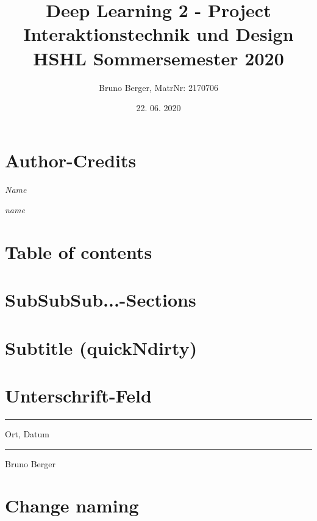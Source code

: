\section{Author-Credits}

\hfill\textnormal{\emph{Name}}

\begin{flushright}
\emph{name}
\end{flushright}

\section{Table of contents}


\tableofcontents
{}


\section{SubSubSub...-Sections}



\section{Subtitle (quickNdirty)}

\title{Deep Learning 2 - Project\\
    \vspace{+14pt}
        \Large Interaktionstechnik und Design \\
        HSHL  Sommersemester 2020}
\author{Bruno Berger, MatrNr: 2170706}
\date{22. 06. 2020}


\section{Unterschrift-Feld}
\vfill
\parbox{5cm}{
\hrule
\strut Ort, Datum}
\hfill\parbox{6cm}
{\hrule \strut Bruno Berger}

\section{Change naming}
\renewcommand{\abstractname}{Vorwort}

\printbibliography[title = {Literature}]
